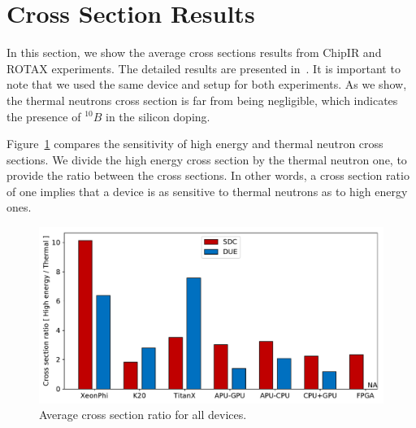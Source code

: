 %

\section{Cross Section Results}
\label{sec_results}


In this section, we show the average cross sections results from ChipIR and ROTAX experiments. The detailed results are presented in~\cite{jsc2020}. It is important to note that we used the same device and setup for both experiments. As we show, the thermal neutrons cross section is far from being negligible, which indicates the presence of $^{10}B$ in the silicon doping.

Figure~\ref{cs_ratio} compares the sensitivity of high energy and thermal neutron cross sections. We divide the high energy cross section by the thermal neutron one, to provide the ratio between the cross sections. In other words, a cross section ratio of one implies that a device is as sensitive to thermal neutrons as to high energy ones.

\begin{figure}[th]
	\centering
	\includegraphics[width=1.0\columnwidth]{./figs/cross_section_ratio.pdf}
	\caption{Average cross section ratio for all devices.}
	\label{cs_ratio}
\end{figure}


